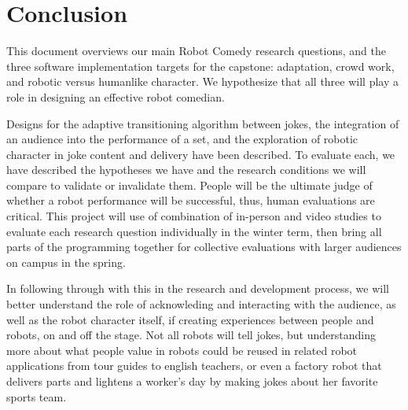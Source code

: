 \documentclass[onecolumn, draftclsnofoot,10pt, compsoc]{IEEEtran}
\begin{document}
\section{Conclusion}
This document overviews our main Robot Comedy research questions, and the three software implementation targets
for the capstone: adaptation, crowd work, and robotic versus humanlike character. We hypothesize that all three will
play a role in designing an effective robot comedian.

Designs for the adaptive transitioning algorithm between jokes, the integration of an audience into the performance
of a set, and the exploration of robotic character in joke content and delivery have been described. To evaluate each,
we have described the hypotheses we have and the research conditions we will compare to validate or invalidate them.
People will be the ultimate judge of whether a robot performance will be successful, thus, human evaluations are critical.
This project will use of combination of in-person and video studies to evaluate each research question individually in
the winter term, then bring all parts of the programming together for collective evaluations with larger audiences on
campus in the spring.

In following through with this in the research and development process, we will better understand the role of
acknowleding and interacting with the audience, as well as the robot character itself, if creating experiences between
people and robots, on and off the stage. Not all robots will tell jokes, but understanding more about what people value
in robots could be reused in related robot applications from tour guides to english teachers, or even a factory robot that
delivers parts and lightens a worker’s day by making jokes about her favorite sports team.



\pagebreak

\pagebreak
\clearpage
\end{document}
